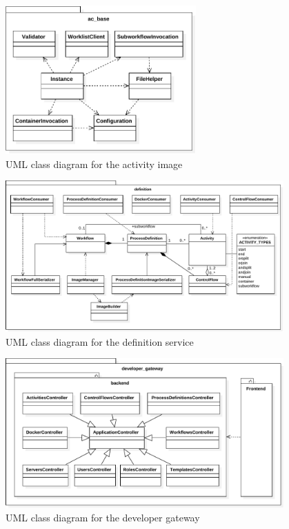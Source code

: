   \begin{figure}[htbp]
    \centering
    \includegraphics[width=0.65\textwidth]{content/images/class_diagram_activity_image-crop.pdf}
    \caption{UML class diagram for the activity image}
  \label{fig:uml_class_diagram_ac_base}
  \end{figure}

  \begin{figure}[htbp]
    \centering
    \includegraphics[width=0.95\textwidth]{content/images/class_diagram_definition-crop.pdf}
    \caption{UML class diagram for the definition service}
    \label{fig:class_diagram_definition}
  \end{figure}

  \begin{figure}[htbp]
    \centering
    \includegraphics[width=0.95\textwidth]{content/images/class_diagram_developer_gateway-crop.pdf}
    \caption{UML class diagram for the developer gateway}
    \label{fig:class_diagram_developer_gateway}
  \end{figure}

